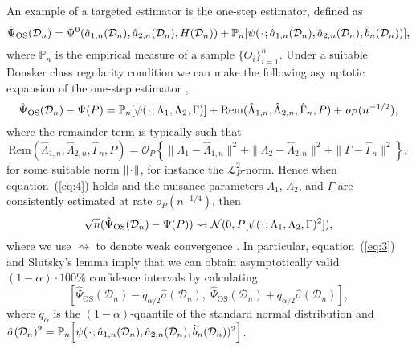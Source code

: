 \documentclass{statsoc}
\newcommand{\blank}{\makebox[1ex]{\textbf{$\cdot$}}}
\newcommand{\weakly}{\rightsquigarrow}
\newcommand\smallO{\textit{o}}
\newcommand{\1}{\mathds{1}}
\newcommand{\empmeas}{\ensuremath{\mathbb{P}_n}} %
\newcommand{\data}{\ensuremath{\mathcal{D}}}
\begin{document}
An example of a targeted estimator is the one-step estimator, defined as
\begin{equation}
    \label{eq:one-step-def}
    \hat{\Psi}_{\text{OS}}(\data_n)
    =
    \tilde{\Psi}^0(\hat{a}_{1,n}(\data_n), \hat{a}_{2,n}(\data_n),
    H(\data_n))
    + \empmeas{[\psi(\blank; \hat{a}_{1,n}(\data_n), \hat{a}_{2,n}(\data_n),
      \hat{b}_n(\data_n) )]},
\end{equation}
where \( \empmeas \) is the empirical measure of a sample \(\{O_i\}_{i=1}^n\).
Under a suitable Donsker class regularity condition we can make the following
asymptotic expansion of the one-step estimator
\citep{pfanzagl1985contributions,van2003unified,fisher2021visually,kennedy2022semiparametric,rytgaard2022continuous},
\begin{equation*}
  \hat{\Psi}_{\text{OS}}(\data_n)- \Psi(P)
  =  \empmeas{[\psi(\blank ; \Lambda_1, \Lambda_2, \Gamma)]}
  +\mathrm{Rem}{(\hat{\Lambda}_{1,n},\hat{\Lambda}_{2,n},  \hat{\Gamma}_n, P)} + \smallO_{P}(n^{-1/2}),
\end{equation*}
where the remainder term is typically such that
\begin{equation}
  \label{eq:4}
  \mathrm{Rem}{(\hat{\Lambda}_{1,n},\hat{\Lambda}_{2,n},  \hat{\Gamma}_n, P)}
  = \mathcal{O}_P{
    \left\{
      \|\Lambda_1-\hat{\Lambda}_{1,n}\|^2
      +
      \|\Lambda_2-\hat{\Lambda}_{2,n}\|^2
      +
      \|\Gamma-\hat{\Gamma}_{n}\|^2
    \right\}
  },
\end{equation}
for some suitable norm \( \|\blank \| \), for instance the
\( \mathcal{L}_{P}^2 \)-norm. Hence when equation~(\ref{eq:4}) holds and the
nuisance parameters $\Lambda_1$, $\Lambda_2$, and $\Gamma$ are consistently
estimated at rate \( \smallO_P{(n^{-1/4})} \), then
\begin{equation}
  \label{eq:3}
  \sqrt{n}(\hat{\Psi}_{\text{OS}}(\data_n)- \Psi(P)) \weakly \mathcal{N}(0,
  P{[\psi(\blank; \Lambda_1, \Lambda_2, \Gamma)^2]}),
\end{equation}
where we use \( \weakly \) to denote weak convergence \citep{van2000asymptotic}.
In particular, equation~(\ref{eq:3}) and Slutsky's lemma imply that we can
obtain asymptotically valid \((1-\alpha)\cdot100\%\) confidence intervals by
calculating
\begin{equation*}
  \left[
    \hat{\Psi}_{\text{OS}}(\data_n) - q_{\alpha/2} \hat{\sigma}(\data_n) ,
    \;
    \hat{\Psi}_{\text{OS}}(\data_n) + q_{\alpha/2} \hat{\sigma}(\data_n)
  \right],
\end{equation*}
where \( q_{\alpha} \) is the \( (1-\alpha) \)-quantile of the standard normal
distribution and
\( \hat{\sigma}(\data_n)^2 = \empmeas{ \left[ \psi(\blank;
    \hat{a}_{1,n}(\data_n), \hat{a}_{2,n}(\data_n), \hat{b}_n(\data_n))^2
  \right]} \).
\end{document}
